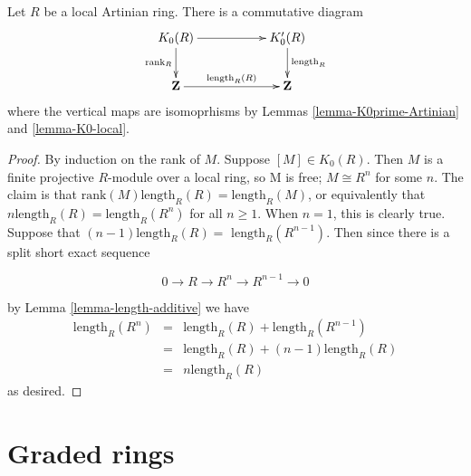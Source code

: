 \begin{lemma}
\label{lemma-K0-and-K0prime-Artinian-local}
Let $R$ be a local Artinian ring. There is a commutative
diagram
$$
\xymatrix{
K_0(R) \ar[rr] \ar[d]_{\text{rank}_R} & &
K_0'(R) \ar[d]^{\text{length}_R} \\
\mathbf{Z} \ar[rr]^{\text{length}_R(R)} & &
\mathbf{Z}
}
$$
where the vertical maps are isomoprhisms by Lemmas
\ref{lemma-K0prime-Artinian} and \ref{lemma-K0-local}.
\end{lemma}

\begin{proof}
By induction on the rank of $M$.
Suppose $\left[M\right] \in K_0(R)$.
Then $M$ is a finite projective $R$-module
over a local ring, so M is free;
$M \cong R^n$ for some $n$.
The claim is that
$\text{rank} (M) \text{length}_R (R) = \text{length}_R(M)$,
or equivalently that $n\text{length}_R(R) = \text{length}_R (R^n)$
for all $n \geq 1$. When $n = 1$, this is clearly true.
Suppose that $(n-1) \text{length}_R(R) =\text{ length}_R(R^{n-1})$.
Then since there is a split short exact sequence

\[
0 \rightarrow R \rightarrow R^n \rightarrow R^{n-1} \rightarrow 0
\]

\noindent
by Lemma \ref{lemma-length-additive} we have
\begin{eqnarray*}
\text{length}_R(R^n) & = & \text{length}_R(R) + \text{length}_R(R^{n-1}) \\
& = & \text{length}_R(R) + (n-1) \text{length}_R(R) \\
& = & n\text{length}_R(R)
\end{eqnarray*}
as desired.
\end{proof}

















\section{Graded rings}
\label{section-graded}

